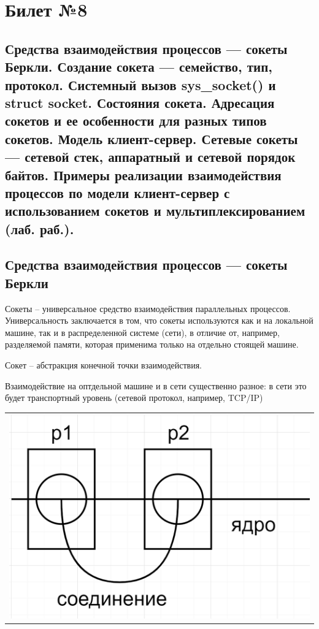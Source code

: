 \chapter{Билет №8}

\section*{Средства взаимодействия процессов — сокеты Беркли. Создание сокета — семейство, тип, протокол. Системный вызов sys\_socket() и struct socket. Состояния сокета. Адресация сокетов и ее особенности для разных типов сокетов. Модель клиент-сервер. Сетевые сокеты — сетевой стек, аппаратный и сетевой порядок байтов. Примеры реализации взаимодействия процессов по модели клиент-сервер с использованием сокетов и мультиплексированием (лаб. раб.).}

\section{Средства взаимодействия процессов — сокеты Беркли}
Сокеты -- универсальное средство взаимодействия параллельных процессов. Универсальность заключается в том, что сокеты используются как и на локальной машине, так и в распределенной системе (сети), в отличие от, например, разделяемой памяти, которая применима только на отдельно стоящей машине.

Сокет -- абстракция конечной точки взаимодействия.

Взаимодействие на оптдельной машине и в сети существенно разное: в сети это будет транспортный уровень (сетевой протокол, например, TCP/IP)

\begin{table}[H]
  \centering
  \begin{tabular}{p{1\linewidth}}
    \centering
    \includegraphics[width=0.8\linewidth]{./images/1.png}
  \end{tabular}
\end{table}

